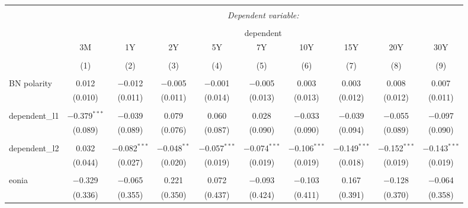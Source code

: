 
\begin{table}[!htbp] \centering 
  \caption{} 
  \label{} 
  \begin{adjustbox}{width=1.35\textwidth}
\begin{tabular}{@{\extracolsep{5pt}}lccccccccc} 
\\[-1.8ex]\hline 
\hline \\[-1.8ex] 
 & \multicolumn{9}{c}{\textit{Dependent variable:}} \\ 
\cline{2-10} 
\\[-1.8ex] & \multicolumn{9}{c}{dependent} \\ 
 & 3M & 1Y & 2Y & 5Y & 7Y & 10Y & 15Y & 20Y & 30Y \\ 
\\[-1.8ex] & (1) & (2) & (3) & (4) & (5) & (6) & (7) & (8) & (9)\\ 
\hline \\[-1.8ex] 
 BN polarity & 0.012 & $-$0.012 & $-$0.005 & $-$0.001 & $-$0.005 & 0.003 & 0.003 & 0.008 & 0.007 \\ 
  & (0.010) & (0.011) & (0.011) & (0.014) & (0.013) & (0.013) & (0.012) & (0.012) & (0.011) \\ 
  & & & & & & & & & \\ 
 dependent\_l1 & $-$0.379$^{***}$ & $-$0.039 & 0.079 & 0.060 & 0.028 & $-$0.033 & $-$0.039 & $-$0.055 & $-$0.097 \\ 
  & (0.089) & (0.089) & (0.076) & (0.087) & (0.090) & (0.090) & (0.094) & (0.089) & (0.090) \\ 
  & & & & & & & & & \\ 
 dependent\_l2 & 0.032 & $-$0.082$^{***}$ & $-$0.048$^{**}$ & $-$0.057$^{***}$ & $-$0.074$^{***}$ & $-$0.106$^{***}$ & $-$0.149$^{***}$ & $-$0.152$^{***}$ & $-$0.143$^{***}$ \\ 
  & (0.044) & (0.027) & (0.020) & (0.019) & (0.019) & (0.019) & (0.018) & (0.019) & (0.019) \\ 
  & & & & & & & & & \\ 
 eonia & $-$0.329 & $-$0.065 & 0.221 & 0.072 & $-$0.093 & $-$0.103 & 0.167 & $-$0.128 & $-$0.064 \\ 
  & (0.336) & (0.355) & (0.350) & (0.437) & (0.424) & (0.411) & (0.391) & (0.370) & (0.358) \\ 

\end{tabular}
\end{adjustbox}
\end{table}
